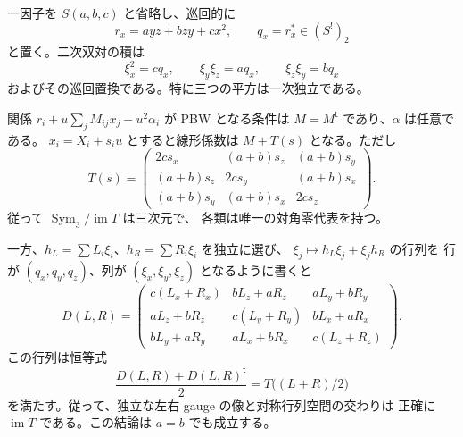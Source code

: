 \begin{lemma}
\label{ebc:lem:translation-gauge}
一因子を $S(a,b,c)$ と省略し、巡回的に
\[
 r_x=ayz+bzy+cx^2,\qquad
 q_x=r_x^*\in (S^!)_2
\]
と置く。二次双対の積は
\begin{equation}\label{ebc:eq:dual-products}
 \xi_x^2=cq_x,\qquad \xi_y\xi_z=aq_x,\qquad
 \xi_z\xi_y=bq_x
\end{equation}
およびその巡回置換である。特に三つの平方は一次独立である。

関係 $r_i+u\sum_jM_{ij}x_j-u^2\alpha_i$ が PBW となる条件は
$M=M^{\mathsf t}$ であり、$\alpha$ は任意である。
$x_i=X_i+s_i u$ とすると線形係数は $M+T(s)$ となる。ただし
\begin{equation}\label{ebc:eq:translation}
 T(s)=
 \begin{pmatrix}
 2cs_x&(a+b)s_z&(a+b)s_y\\
 (a+b)s_z&2cs_y&(a+b)s_x\\
 (a+b)s_y&(a+b)s_x&2cs_z
 \end{pmatrix}.
\end{equation}
従って $\operatorname{Sym}_3/\operatorname{im}T$ は三次元で、
各類は唯一の対角零代表を持つ。

一方、$h_L=\sum L_i\xi_i$、$h_R=\sum R_i\xi_i$ を独立に選び、
$\xi_j\mapsto h_L\xi_j+\xi_jh_R$ の行列を
行が $(q_x,q_y,q_z)$、列が $(\xi_x,\xi_y,\xi_z)$ となるように書くと
\begin{equation}\label{ebc:eq:independent-gauge}
 D(L,R)=
 \begin{pmatrix}
 c(L_x+R_x)&bL_z+aR_z&aL_y+bR_y\\
 aL_z+bR_z&c(L_y+R_y)&bL_x+aR_x\\
 bL_y+aR_y&aL_x+bR_x&c(L_z+R_z)
 \end{pmatrix}.
\end{equation}
この行列は恒等式
\begin{equation}\label{ebc:eq:symmetric-gauge}
 \frac{D(L,R)+D(L,R)^{\mathsf t}}2=T\bigl((L+R)/2\bigr)
\end{equation}
を満たす。従って、独立な左右 gauge の像と対称行列空間の交わりは
正確に $\operatorname{im}T$ である。この結論は $a=b$ でも成立する。
\end{lemma}

